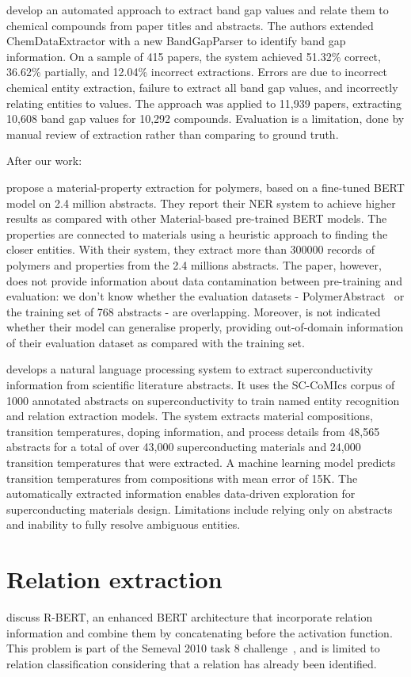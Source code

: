 \cite{ghosh2022band} develop an automated approach to extract band gap values and relate them to chemical compounds from paper titles and abstracts.
The authors extended ChemDataExtractor with a new BandGapParser to identify band gap information.
On a sample of 415 papers, the system achieved 51.32\% correct, 36.62\% partially, and 12.04\% incorrect extractions.
Errors are due to incorrect chemical entity extraction, failure to extract all band gap values, and incorrectly relating entities to values.
The approach was applied to 11,939 papers, extracting 10,608 band gap values for 10,292 compounds.
Evaluation is a limitation, done by manual review of extraction rather than comparing to ground truth.

After our work: 

\cite{pranav2023a} propose a material-property extraction for polymers, based on a fine-tuned BERT model on 2.4 million abstracts. They report their NER system to achieve higher results as compared with other Material-based pre-trained BERT models. The properties are connected to materials using a heuristic approach to finding the closer entities.
With their system, they extract more than 300000 records of polymers and properties from the 2.4 millions abstracts. 
The paper, however, does not provide information about data contamination between pre-training and evaluation: we don't know whether the evaluation datasets - PolymerAbstract~\cite{huan2016a} or the training set of 768 abstracts - are overlapping. 
Moreover, is not indicated whether their model can generalise properly, providing out-of-domain information of their evaluation dataset as compared with the training set. 



\cite{mitsui2023automatic} develops a natural language processing system to extract superconductivity information from scientific literature abstracts.
It uses the SC-CoMIcs corpus of 1000 annotated abstracts on superconductivity to train named entity recognition and relation extraction models.
The system extracts material compositions, transition temperatures, doping information, and process details from 48,565 abstracts for a total of over 43,000 superconducting materials and 24,000 transition temperatures that were extracted.
A machine learning model predicts transition temperatures from compositions with mean error of 15K.
The automatically extracted information enables data-driven exploration for superconducting materials design.
Limitations include relying only on abstracts and inability to fully resolve ambiguous entities.




\section{Relation extraction}

\cite{wu2019enriching} discuss R-BERT, an enhanced BERT architecture that incorporate relation information and combine them by concatenating before the activation function. 
This problem is part of the Semeval 2010 task 8 challenge~\cite{hendrickx2019semeval}, and is limited to relation classification considering that a relation has already been identified.
